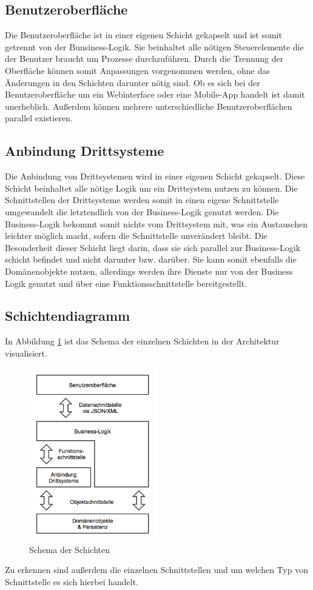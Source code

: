 \documentclass[a4paper,12pt]{article} %
\begin{document}
\subsection{Benutzeroberfläche}
Die Benutzeroberfläche ist in einer eigenen Schicht gekapselt und ist somit getrennt von der Bunsiness-Logik. Sie beinhaltet alle nötigen Steuerelemente die der Benutzer braucht um Prozesse durchzuführen. Durch die Trennung der Oberfläche können somit Anpassungen vorgenommen werden, ohne das Änderungen in den Schichten darunter nötig sind. Ob es sich bei der Benutzeroberfläche um ein Webinterface oder eine Mobile-App handelt ist damit unerheblich. Außerdem können mehrere unterschiedliche Benutzeroberflächen parallel existieren.

\subsection{Anbindung Drittsysteme}
Die Anbindung von Drittsystemen wird in einer eigenen Schicht gekapselt. Diese Schicht beinhaltet alle nötige Logik um ein Drittsystem nutzen zu können. Die Schnittstellen der Drittsysteme werden somit in einen eigene Schnittstelle umgewandelt die letztendlich von der Business-Logik genutzt werden. Die Business-Logik bekommt somit nichts vom Drittsystem mit, was ein Austauschen leichter möglich macht, sofern die Schnittstelle unverändert bleibt. Die Besonderheit dieser Schicht liegt darin, dass sie sich parallel zur Business-Logik schicht befindet und nicht darunter bzw. darüber. Sie kann somit ebenfalls die Domänenobjekte nutzen, allerdings werden ihre Dienste nur von der Business Logik genutzt und über eine Funktionsschnittstelle bereitgestellt.

\subsection{Schichtendiagramm}
In Abbildung \ref{fig:architektur} ist das Schema der einzelnen Schichten in der Architektur visualisiert.
\begin{figure}[H]
	\centering
	\includegraphics[width=0.5\textwidth]{img/architektur.png}
	\caption{Schema der Schichten}
	\label{fig:architektur}
\end{figure}
Zu erkennen sind außerdem die einzelnen Schnittstellen und um welchen Typ von Schnittstelle es sich hierbei handelt.
\end{document}
